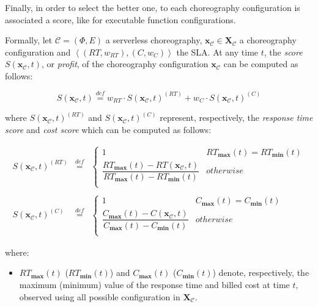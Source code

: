 \documentclass[12pt,a4paper]{report}
\newcommand{\mathDef}{\overset{\textit{def}}{=}}
\begin{document}
Finally, in order to select the better one, to each choreography configuration is associated a score, like for executable function configurations. 

Formally, let $\mathcal{C} = (\Phi,E)$ a serverless choreography, $\textbf{x}_{\mathcal{C}} \in \textbf{X}_{\mathcal{C}}$ a choreography configuration and $\left\langle (RT,w_{RT}),(C,w_{C}) \right\rangle$ the SLA. At any time $t$, the \textit{score} $S(\textbf{x}_{\mathcal{C}},t)$, or \textit{profit}, of the choreography configuration $\textbf{x}_{\mathcal{C}}$ can be computed as follows:

\begin{equation}
	S(\textbf{x}_{\mathcal{C}},t) \mathDef w_{RT} \cdot S(\textbf{x}_{\mathcal{C}},t)^{(RT)} + w_{C} \cdot S(\textbf{x}_{\mathcal{C}},t)^{(C)}
\end{equation}


where $S(\textbf{x}_{\mathcal{C}},t)^{(RT)}$ and $S(\textbf{x}_{\mathcal{C}},t)^{(C)}$ represent, respectively, the \textit{response time score} and \textit{cost score} which can be computed as follows:

\begin{eqnarray}
	S(\textbf{x}_{\mathcal{C}},t)^{(RT)} & \mathDef & \left\{ 
	\begin{array}{lc}
		1 & RT_{\textbf{max}}(t) = RT_{\textbf{min}}(t) \\ 
		\dfrac{RT_{\textbf{max}}(t) - RT(\textbf{x}_{\mathcal{C}},t)}{RT_{\textbf{max}}(t) - RT_{\textbf{min}}(t)} & otherwise \\ 
	\end{array} \right. \\\nonumber\\
	S(\textbf{x}_{\mathcal{C}},t)^{(C)} & \mathDef & \left\{ 
	\begin{array}{lc}
		1 & C_{\textbf{max}}(t) = C_{\textbf{min}}(t) \\ 
		\dfrac{C_{\textbf{max}}(t) - C(\textbf{x}_{\mathcal{C}},t)}{C_{\textbf{max}}(t) - C_{\textbf{min}}(t)} & otherwise \\ 
	\end{array} \right.
\end{eqnarray}



where:

\begin{itemize}
	\item $RT_{\textbf{max}}(t)$ ($RT_{\textbf{min}}(t)$) and $C_{\textbf{max}}(t)$ ($C_{\textbf{min}}(t)$) denote, respectively, the maximum (minimum) value of the response time and billed cost at time $t$, observed using all possible configuration in $\textbf{X}_{\mathcal{C}}$.
\end{itemize}
\end{document}

